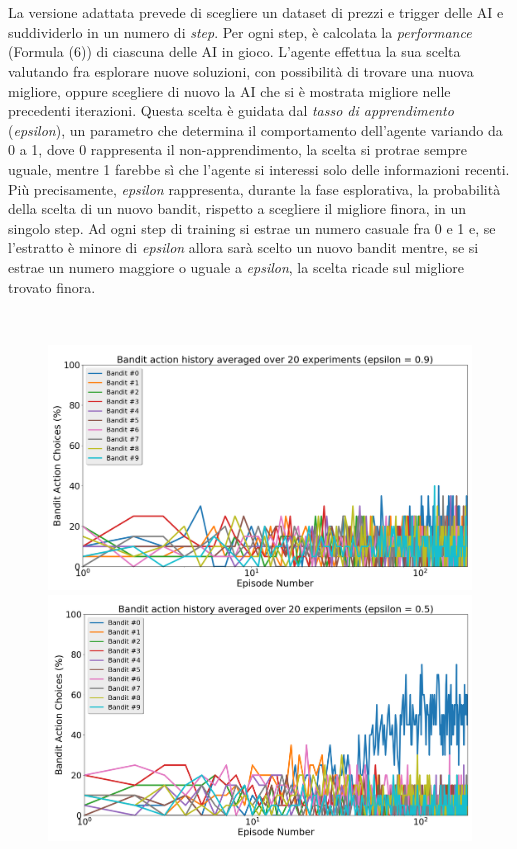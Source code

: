 \documentclass[a4paper,12pt]{report}
\begin{document}
\begin{fig}
\\~\\La versione adattata prevede di scegliere un dataset di prezzi e trigger delle AI e suddividerlo in un numero di \textit{step}. Per ogni step, è calcolata la \textit{performance} (Formula (6)) di ciascuna delle AI in gioco. L'agente effettua la sua scelta valutando fra esplorare nuove soluzioni, con possibilità di trovare una nuova migliore, oppure scegliere di nuovo la AI che si è mostrata migliore nelle precedenti iterazioni. Questa scelta è guidata dal \textit{tasso di apprendimento} (\textit{epsilon}), un parametro che determina il comportamento dell'agente variando da 0 a 1, dove 0 rappresenta il non-apprendimento, la scelta si protrae sempre uguale, mentre 1 farebbe sì che l'agente si interessi solo delle informazioni recenti.\\ Più precisamente, \textit{epsilon} rappresenta, durante la fase esplorativa, la probabilità della scelta di un nuovo bandit, rispetto a scegliere il migliore finora, in un singolo step. Ad ogni step di training si estrae un numero casuale fra 0 e 1 e, se l'estratto è minore di \textit{epsilon} allora sarà scelto un nuovo bandit mentre, se si estrae un numero maggiore o uguale a \textit{epsilon}, la scelta ricade sul migliore trovato finora.\\
\begin{fig}
	\\
	\begin{subfigure}{\linewidth}
		\includegraphics[width=.5\linewidth]{bandit_choice_09}
		\includegraphics[width=.5\linewidth]{bandit_choice_05}
	\end{subfigure}
	\begin{subfigure}{\linewidth}

\end{subfigure}
\end{fig}
\end{fig}
\end{document}
